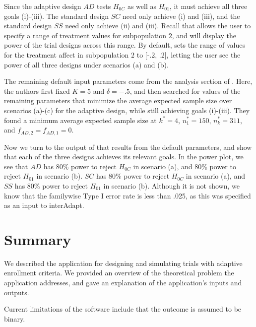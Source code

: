 \documentclass[article]{jss}
\begin{document}
Since the adaptive design $AD$ tests $H_{0C}$ as well as $H_{01}$, it must achieve all three goals (i)-(iii). The standard design $SC$ need only achieve (i) and (iii), and the standard design $SS$ need only achieve (ii) and (iii). Recall that  allows the user to specify a range of treatment values for subpopulation $2$, and will display the power of the trial designs across this range. By default,  sets the range of values for the treatment affect in subpopulation $2$ to [-.2, .2], letting the user see the power of all three designs under scenarios (a) and (b). %
 
The remaining default input parameters come from the analysis section of \citep{Rosenblum2013AdaptMISTIE}. Here, the authors first fixed $K=5$ and $δ=-.5$, and then searched for values of the remaining parameters that minimize the average expected sample size over scenarios (a)-(c) for the adaptive design, while still achieving goals (i)-(iii). They found a minimum average expected sample size at $k^*=4$, $n_1^*=150$, $n_k^*=311$, and $f_{AD,2}=f_{AD,1}=0$. %

Now we turn to the output of  that results from the default parameters, and show that each of the three designs achieves its relevant goals. In the power plot, we see that $AD$ has 80\% power to reject $H_{0C}$ in scenario (a), and 80\% power to reject $H_{01}$ in scenario (b). $SC$ has 80\% power to reject $H_{0C}$ in scenario (a), and $SS$ has 80\% power to reject $H_{01}$ in scenario (b). Although it is not shown, we know that the familywise Type I error rate is less than .025, as this was specified as an input to \textsf{interAdapt}. %




\section*{Summary}
\label{sec:Summary}

We described the  application for designing and simulating trials with adaptive enrollment criteria. We provided an overview of the theoretical problem the application addresses, and gave an explanation of the application’s inputs and outputs.

Current limitations of the software include that the outcome is assumed to be binary.
\end{document}
